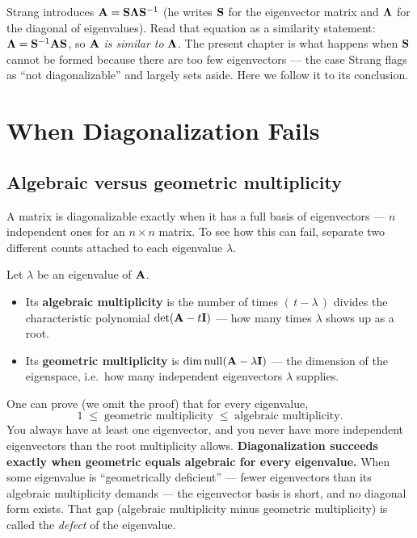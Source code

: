 \begin{strangbox}
Strang introduces $\mathbf{A}=\mathbf{S}\mathbf{\Lambda}\mathbf{S}^{-1}$ (he writes $\mathbf{S}$ for the
eigenvector matrix and $\mathbf{\Lambda}$ for the diagonal of eigenvalues). Read that
equation as a similarity statement: $\mathbf{\Lambda}=\mathbf{S}^{-1}\mathbf{A}\mathbf{S}$, so
$\mathbf{A}$ \emph{is similar to} $\mathbf{\Lambda}$. The present chapter is what happens when
$\mathbf{S}$ cannot be formed because there are too few eigenvectors --- the case Strang
flags as ``not diagonalizable'' and largely sets aside. Here we follow it to its
conclusion.
\end{strangbox}

\section{When Diagonalization Fails}
\label{ch28:fails}

\subsection{Algebraic versus geometric multiplicity}

A matrix is diagonalizable exactly when it has a full basis of eigenvectors --- $n$
independent ones for an $n\times n$ matrix. To see how this can fail, separate two
different counts attached to each eigenvalue $\lambda$.

\begin{definition}
\label{ch28:def-mult}
Let $\lambda$ be an eigenvalue of $\mathbf{A}$.
\begin{itemize}
\item Its \textbf{algebraic multiplicity} is the number of times $(\,t-\lambda\,)$ divides
  the characteristic polynomial $\det(\mathbf{A}-t\mathbf{I})$ --- how many times $\lambda$
  shows up as a root.
\item Its \textbf{geometric multiplicity} is $\operatorname{dim}\operatorname{null}(\mathbf{A}-\lambda\mathbf{I})$ ---
  the dimension of the eigenspace, i.e.\ how many independent eigenvectors $\lambda$
  supplies.
\end{itemize}
\end{definition}

One can prove (we omit the proof) that for every eigenvalue,
\[
1 \;\le\; \text{geometric multiplicity} \;\le\; \text{algebraic multiplicity}.
\]
You always have at least one eigenvector, and you never have more independent
eigenvectors than the root multiplicity allows. \textbf{Diagonalization succeeds exactly
when geometric equals algebraic for every eigenvalue.} When some eigenvalue is
``geometrically deficient'' --- fewer eigenvectors than its algebraic multiplicity
demands --- the eigenvector basis is short, and no diagonal form exists. That gap
(algebraic multiplicity minus geometric multiplicity) is called the \emph{defect} of the eigenvalue.

